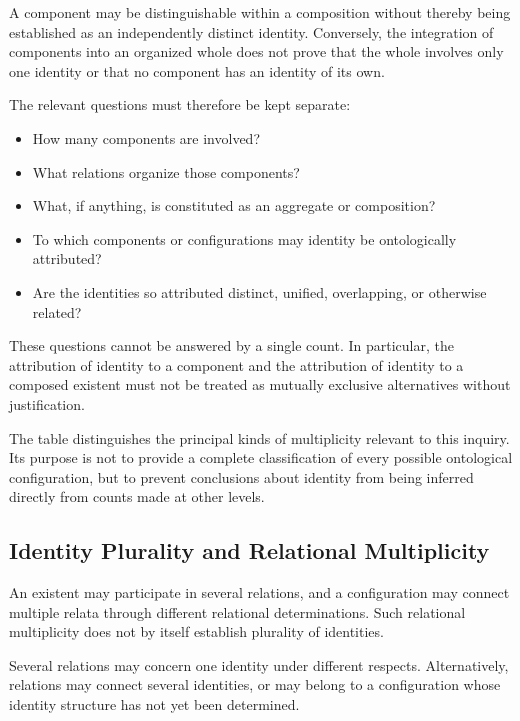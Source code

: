 A component may be distinguishable within a composition
without thereby being established as an independently
distinct identity. Conversely, the integration of components
into an organized whole does not prove that the whole
involves only one identity or that no component has an
identity of its own.

The relevant questions must therefore be kept separate:

\begin{itemize}
    \item How many components are involved?
    \item What relations organize those components?
    \item What, if anything, is constituted as an aggregate
    or composition?
    \item To which components or configurations may identity
    be ontologically attributed?
    \item Are the identities so attributed distinct, unified,
    overlapping, or otherwise related?
\end{itemize}

These questions cannot be answered by a single count.
In particular, the attribution of identity to a component
and the attribution of identity to a composed existent
must not be treated as mutually exclusive alternatives
without justification.



The table distinguishes the principal kinds of multiplicity
relevant to this inquiry. Its purpose is not to provide
a complete classification of every possible ontological
configuration, but to prevent conclusions about identity
from being inferred directly from counts made at other
levels.

\subsection{Identity Plurality and Relational Multiplicity}

An existent may participate in several relations, and a
configuration may connect multiple relata through different
relational determinations. Such relational multiplicity
does not by itself establish plurality of identities.

Several relations may concern one identity under different
respects. Alternatively, relations may connect several
identities, or may belong to a configuration whose identity
structure has not yet been determined.

